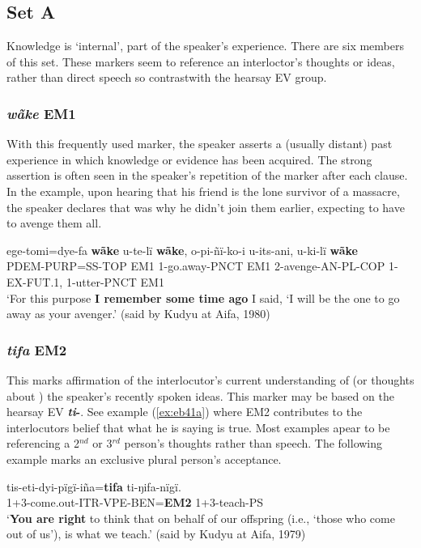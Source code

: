 \documentclass[output=paper]{langsci/langscibook}
\begin{document}
\subsection{Set A}   

Knowledge is ‘internal’, part of the speaker’s experience. There are six members of this set.  These markers seem to reference an interloctor’s thoughts or ideas, rather than direct speech so contrastwith the hearsay EV group.

\subsubsection{\textit{wãke} EM1} 
With this frequently used marker, the speaker asserts a (usually distant) past experience in which knowledge or evidence has been acquired. The strong assertion is often seen in the speaker’s repetition of the marker after each clause.  In the example, upon hearing that his friend is the lone survivor of a massacre, the speaker declares that was why he didn’t join them earlier, expecting to have to avenge them all.

\begin{exe}
	\ex \label{ex:eb1}
	\gll ege-tomi=dye-fa \textbf{wãke} u-te-lï \textbf{wãke}, o-pi-ñï-ko-i u-its-ani, u-ki-lï \textbf{wãke}\\
	PDEM-PURP=SS-TOP EM1 1-go.away-PNCT EM1 2-avenge-AN-PL-COP 1-EX-FUT.1, 1-utter-PNCT EM1\\
	\trans ‘For this purpose \textbf{I remember some time ago} I said, ‘I will be the one to go away as your avenger.’ (said by Kudyu at Aifa, 1980)
\end{exe}

\subsubsection{\textit{tifa} EM2}
This marks affirmation of the interlocutor’s current understanding of  (or thoughts about )  the speaker’s recently spoken ideas. This marker may be based on the hearsay EV \textbf{\textit{ti}-}.  See example (\ref{ex:eb41a}) where EM2 contributes to the interlocutors belief that what he is saying is true.   Most examples apear to be referencing a 2$^{nd}$ or 3$^{rd}$ person’s thoughts rather than speech. 
The following example marks an exclusive plural person’s acceptance. 


\begin{exe}
	\ex \label{ex:eb2}
	\gll tis-eti-dyi-pïgï-iña=\textbf{tifa} ti-ŋifa-nïgï.\\
	1+3-come.out-ITR-VPE-BEN=\textbf{EM2} 1+3-teach-PS\\
	\trans ‘\textbf{You are right} to think that on behalf of our offspring (i.e., ‘those who come out of us’), is what we teach.' (said by Kudyu at Aifa, 1979)
\end{exe}
\end{document}
